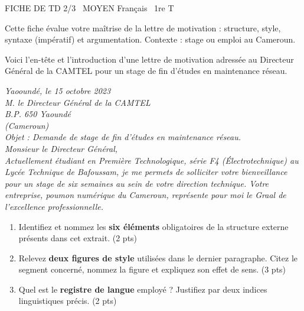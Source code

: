 \documentclass[11pt]{article}
\begin{document}
\begin{tcolorbox}[enhanced,colback=popink,colframe=popink,arc=10pt,boxrule=0pt,left=12pt,right=12pt,top=9pt,bottom=9pt]
{\color{white}\popxbold\small FICHE DE TD 2/3 \textbullet\ MOYEN \hfill Français \textbullet\ 1re T\par}
\end{tcolorbox}
\vspace{4pt}
\noindent Cette fiche évalue votre maîtrise de la lettre de motivation : structure, style, syntaxe (impératif) et argumentation. Contexte : stage ou emploi au Cameroun.

\begin{exercice}
Voici l'en-tête et l'introduction d'une lettre de motivation adressée au Directeur Général de la CAMTEL pour un stage de fin d'études en maintenance réseau.

\textit{Yaooundé, le 15 octobre 2023\\
M. le Directeur Général de la CAMTEL\\
B.P. 650 Yaoundé\\
(Cameroun)\\
Objet : Demande de stage de fin d'études en maintenance réseau.\\
Monsieur le Directeur Général,\\
Actuellement étudiant en Première Technologique, série F4 (Électrotechnique) au Lycée Technique de Bafoussam, je me permets de solliciter votre bienveillance pour un stage de six semaines au sein de votre direction technique. Votre entreprise, poumon numérique du Cameroun, représente pour moi le Graal de l'excellence professionnelle.}
\begin{enumerate}
    \item Identifiez et nommez les \textbf{six éléments} obligatoires de la structure externe présents dans cet extrait. (2 pts)
    \item Relevez \textbf{deux figures de style} utilisées dans le dernier paragraphe. Citez le segment concerné, nommez la figure et expliquez son effet de sens. (3 pts)
    \item Quel est le \textbf{registre de langue} employé ? Justifiez par deux indices linguistiques précis. (2 pts)
\end{enumerate}
\end{exercice}
\end{document}
